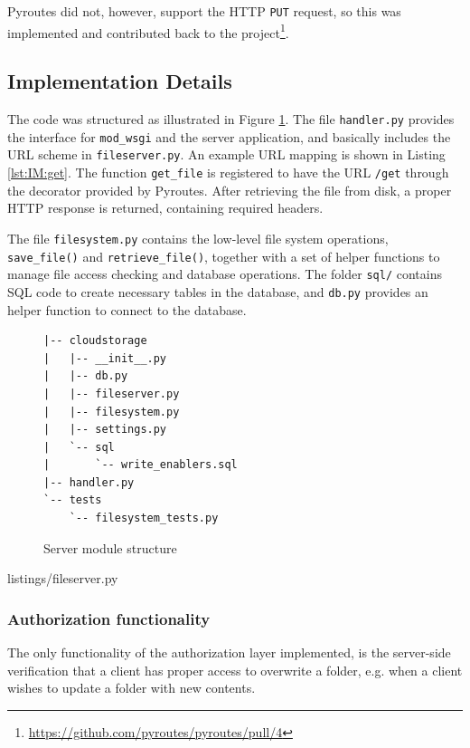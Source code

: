 \documentclass[pdftex,english,10pt,b5paper,twoside]{book}
\begin{document}
Pyroutes did not, however, support the HTTP \texttt{PUT} request, so this was
implemented and contributed back to the
project\footnote{\url{https://github.com/pyroutes/pyroutes/pull/4}}.

\subsection{Implementation Details}

The code was structured as illustrated in Figure \ref{fig:IM:layout}. The file
\texttt{handler.py} provides the interface for \texttt{mod\_wsgi} and the server
application, and basically includes the \ac{URL} scheme in
\texttt{fileserver.py}. An example \ac{URL} mapping is shown in Listing
\ref{lst:IM:get}. The function \texttt{get\_file} is registered to have the
\ac{URL} \texttt{/get} through the decorator provided by Pyroutes. After
retrieving the file from disk, a proper \ac{HTTP} response is returned,
containing required headers.

The file \texttt{filesystem.py} contains the low-level file system operations,
\texttt{save\_file()} and \texttt{retrieve\_file()}, together with a set of
helper functions to manage file access checking and database operations.  The
folder \texttt{sql/} contains \ac{SQL} code to create necessary tables in the
database, and \texttt{db.py} provides an helper function to connect to the
database.

\begin{figure}[h!]
\begin{verbatim}
|-- cloudstorage
|   |-- __init__.py
|   |-- db.py
|   |-- fileserver.py
|   |-- filesystem.py
|   |-- settings.py
|   `-- sql
|       `-- write_enablers.sql
|-- handler.py
`-- tests
    `-- filesystem_tests.py
\end{verbatim}
    \caption{Server module structure}
    \label{fig:IM:layout}
\end{figure}


{listings/fileserver.py}

\subsubsection{Authorization functionality}

The only functionality of the authorization layer implemented, is the
server-side verification that a client has proper access to overwrite a folder,
e.g. when a client wishes to update a folder with new contents.
\end{document}
